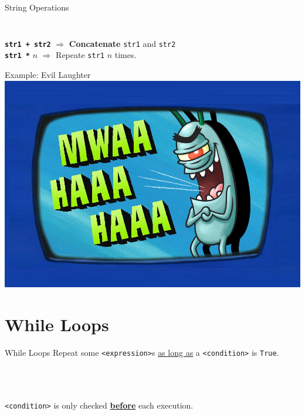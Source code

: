         \begin{frame}{String Operations}
            \large
            \pause
            \inputminted[frame=single,framesep=2pt, lastline=4]{python3}{code-examples/string_operations.py}
            \pause
            \inputminted[frame=single,framesep=2pt, firstline=6]{python3}{code-examples/string_operations.py}
            \pause
            \LARGE
            \texttt{\textbf{str1 + str2}} $\Rightarrow$ \textbf{Concatenate} \texttt{str1} and \texttt{str2}\\
            \pause
            \texttt{\textbf{str1 *}} $n$ $\Rightarrow$  Repeate \texttt{str1} $n$ times.
        \end{frame}

        \begin{frame}{Example: Evil Laughter}
            \centering
            \includegraphics[height=0.8\textheight]{images/evil_laugh.jpg}
        \end{frame}

    \section{While Loops}
        \begin{frame}{While Loops}
            \pause
            Repeat some \texttt{<expression>}s \underline{as long as} a \texttt{<condition>} is \texttt{True}.
            \pause
            \begin{columns}
                \begin{column}{0.45\textwidth}
                    \inputminted[frame=single,framesep=2pt]{python3}{code-examples/while1.py}
                \end{column}
            \pause 
                \begin{column}{0.45\textwidth}
                    \inputminted[frame=single,framesep=2pt]{python3}{code-examples/while2.py}
                \end{column} 
            \end{columns}
            \pause
            \LARGE
            \inputminted[frame=single,framesep=2pt]{python3}{code-examples/while3.py}
            \pause
            \texttt{<condition>} is only checked \textbf{\underline{before}} each execution.
        \end{frame}

